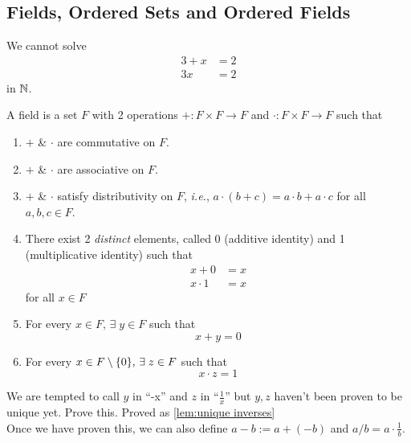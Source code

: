 \documentclass[12pt]{article}
\begin{document}
\subsection{Fields, Ordered Sets and Ordered Fields}
We cannot solve
\begin{align*}
    3 + x &= 2 \\
    3x &= 2
\end{align*}
in $\mathbb{N}$.

\begin{defn} \label{defn:field}
    A field is a set $F$ with 2 operations $+ : F \times F \to F$ and $\cdot : F \times F \to F$ such that
    \begin{enumerate}[label=(F\arabic*)]
        \item \label{field:comm}
            $+$ \& $\cdot$ are commutative on $F$.
        \item \label{field:asso}
            $+$ \& $\cdot$ are associative on $F$.
        \item \label{field:dist}
            $+$ \& $\cdot$ satisfy distributivity on $F$, \textit{i.e.}, $a \cdot (b + c) = a \cdot b + a \cdot c$ for all $a, b, c \in F$. 
        \item \label{field:iden}
            There exist 2 \emph{distinct} elements, called 0 (additive identity) and 1 (multiplicative identity) such that
            \begin{align*}
                x + 0 &= x \\
                x \cdot 1 &= x
            \end{align*}
            for all $x \in F$
        \item \label{field:negative}
            For every $x \in F, \,\exists\; y \in F$ such that \[
                x + y = 0
            \]
        \item \label{field:reciprocal}
            For every $x \in F \setminus \set{0}, \,\exists\; z \in F$ such that \[
                x \cdot z = 1
            \]
    \end{enumerate}
\end{defn}
\begin{rem}
    We are tempted to call $y$ in  ``-x'' and $z$ in  ``$\frac{1}{x}$'' but $y, z$ haven't been proven to be unique yet. \textcolor{red!85!black}{Prove this}. \textcolor{green!30!black}{Proved as \cref{lem:unique inverses}} \\
    Once we have proven this, we can also define $a - b := a + (-b)$ and $a/b = a \cdot \frac{1}{b}$.
\end{rem}
\end{document}
